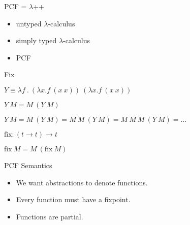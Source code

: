 \documentclass{beamer}
\newcommand{\fix}{\text{fix}}
\newcommand{\arr}{\rightarrow}
\begin{document}
\begin{frame}{PCF = $\lambda$++}


\begin{itemize}
\item untyped $\lambda$-calculus
\item simply typed $\lambda$-calculus
\item PCF
\end{itemize}




\end{frame}


\begin{frame}{Fix}


\begin{center}

\onslide<+->
$Y \equiv \lambda f\ .\ (\lambda x. f\ (x\ x))\ (\lambda x . f\ (x\ x))$
\vspace{1em}

$Y\ M = M\ (Y\ M)$
\vspace{1em}
\onslide<+->

$Y\ M = M\ (Y\ M) = M\ M\ (Y\ M) = M\ M\ M\ (Y\ M) = \ldots$
\vspace{2em}

\onslide<+->
$\fix : (t \arr t) \arr t$
\vspace{1em}

$\fix\ M = M\ (\fix\ M)$

\end{center}


\end{frame}



\begin{frame}{PCF Semantics}
\begin{itemize}
\item We want abstractions to denote functions.
\item Every function must have a fixpoint.
\item Functions are partial.
\end{itemize}
\end{frame}
\end{document}

